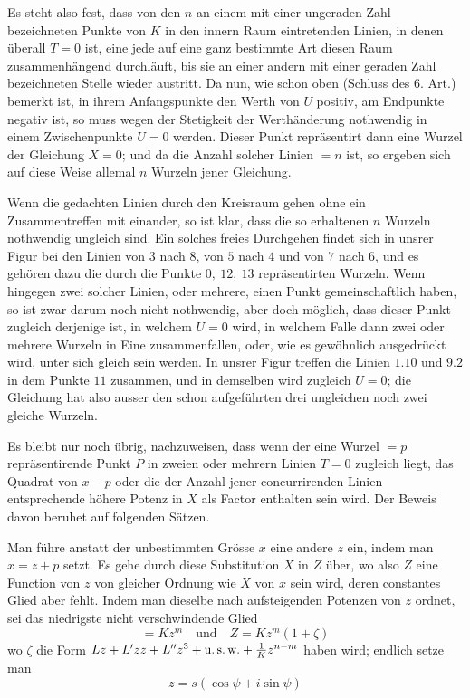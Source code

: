 Es steht also fest, dass von den $n$ an einem mit einer ungeraden Zahl bezeichneten Punkte von $K$ in den innern Raum eintretenden Linien, in denen
überall $T=0$ ist, eine jede auf eine ganz bestimmte Art diesen Raum zusammenhängend durchläuft, bis sie an einer andern mit einer geraden Zahl bezeichneten Stelle wieder austritt. Da nun, wie schon oben (Schluss des 6. Art.) bemerkt
ist, in ihrem Anfangspunkte den Werth von $U$ positiv, am Endpunkte negativ
ist, so muss wegen der Stetigkeit der Werthänderung nothwendig in einem Zwischenpunkte $U=0$ werden. Dieser Punkt repräsentirt dann eine Wurzel der
Gleichung $X=0$; und da die Anzahl solcher Linien $=n$ ist, so ergeben sich
auf diese Weise allemal $n$ Wurzeln jener Gleichung.


Wenn die gedachten Linien durch den Kreisraum gehen ohne ein Zusammentreffen mit einander, so ist klar, dass die so erhaltenen $n$ Wurzeln nothwendig ungleich sind. Ein solches freies Durchgehen findet sich in unsrer Figur bei
den Linien von $3$ nach $8$, von $5$ nach $4$ und von $7$ nach $6$, und es gehören
dazu die durch die Punkte $0,\ 12,\ 13$ repräsentirten Wurzeln. Wenn hingegen
zwei solcher Linien, oder mehrere, einen Punkt gemeinschaftlich haben, so ist
zwar darum noch nicht nothwendig, aber doch möglich, dass dieser Punkt zugleich derjenige ist, in welchem $U=0$ wird, in welchem Falle dann zwei oder
mehrere Wurzeln in Eine zusammenfallen, oder, wie es gewöhnlich ausgedrückt
wird, unter sich gleich sein werden. In unsrer Figur treffen die Linien $1.10$
und $9.2$ in dem Punkte $11$ zusammen, und in demselben wird zugleich $U=0$;
die Gleichung hat also ausser den schon aufgeführten drei ungleichen noch zwei
gleiche Wurzeln.


Es bleibt nur noch übrig, nachzuweisen, dass wenn der eine Wurzel $=p$
repräsentirende Punkt $P$ in zweien oder mehrern Linien $T=0$ zugleich liegt,
das Quadrat von $x-p$ oder die der Anzahl jener concurrirenden Linien entsprechende höhere Potenz in $X$ als Factor enthalten sein wird. Der Beweis davon
beruhet auf folgenden Sätzen.

Man führe anstatt der unbestimmten Grösse $x$ eine andere $z$ ein, indem
man $x=z+p$ setzt. Es gehe durch diese Substitution $X$ in $Z$ über, wo also
$Z$ eine Function von $z$ von gleicher Ordnung wie $X$ von $x$ sein wird, deren constantes Glied aber fehlt. Indem man dieselbe nach aufsteigenden Potenzen von
$z$ ordnet, sei das niedrigste nicht verschwindende Glied
\[
=Kz^m\quad\mbox{und}\quad Z=Kz^m(1+\zeta)
\]
wo $\zeta$ die Form $Lz+L'zz+L''z^3+\mbox{u.\,s.\,w.}+\frac{1}{K}z^{n-m}$ haben wird; endlich setze
man
\[
z=s(\cos\psi+i\sin\psi)
\]

